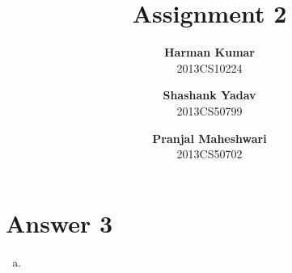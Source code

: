 \documentclass{article}
\title{ \textbf{Assignment 2}}
\author{
	\textbf{Harman Kumar}\\ 
	2013CS10224\\
	\and
	\textbf{Shashank Yadav}\\ 
	2013CS50799\\
	\and
	\textbf{Pranjal Maheshwari}\\ 
	2013CS50702\\
}
\begin{document}
	\maketitle

\section*{{\large \textbf{Answer 3}}}

\begin{enumerate}[a)]

\item 




\end{enumerate}
\end{document}
